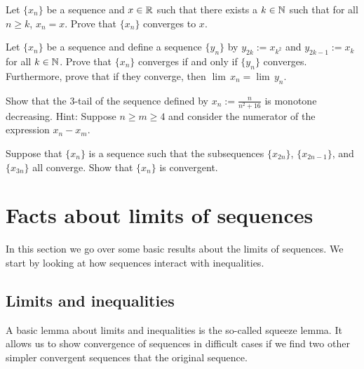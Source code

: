 \begin{exercise}[Easy]
Let $\{ x_n \}$ be a sequence and $x \in {\mathbb{R}}$ such that
there exists a $k \in {\mathbb{N}}$ such that for all $n \geq k$,
$x_n = x$.  Prove that $\{ x_n \}$ converges to $x$.
\end{exercise}

\begin{exercise}
Let $\{ x_n \}$ be a sequence and
define a sequence $\{ y_n \}$ by
$y_{2k} := x_{k^2}$ and $y_{2k-1} := x_k$ for all $k \in {\mathbb{N}}$.
Prove that $\{ x_n \}$ converges if and only if $\{ y_n \}$ converges.
Furthermore, prove that if they converge, then
$\lim\, x_n = \lim\, y_n$.
\end{exercise}

\begin{exercise}
Show that the 3-tail of the sequence defined by $x_n := \frac{n}{n^2+16}$ is
monotone decreasing.  Hint: Suppose $n \geq m \geq 4$ and consider the 
numerator of the expression $x_n-x_m$.
\end{exercise}

\begin{exercise}
Suppose that $\{ x_n \}$ is a sequence such that
the subsequences $\{ x_{2n} \}$, $\{ x_{2n-1} \}$, and
$\{ x_{3n} \}$ all converge.  Show that $\{ x_n \}$ is convergent.
\end{exercise}



\sectionnewpage
\section{Facts about limits of sequences}
\label{sec:factslimsseqs}


In this section we go over some basic results about the limits of
sequences.
We start by looking at how sequences interact with inequalities.

\subsection{Limits and inequalities}

A basic lemma about limits and inequalities is the so-called squeeze lemma.
It allows us to show convergence of sequences in difficult cases
if we find two other simpler convergent sequences that 
 the original sequence.


